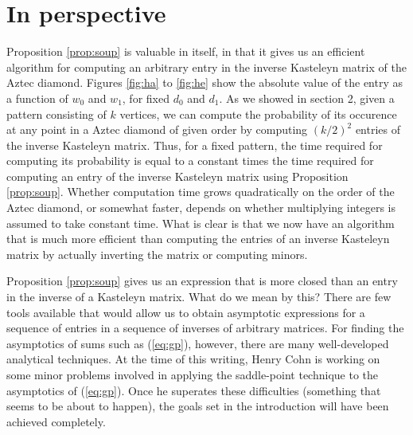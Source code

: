 \documentclass[10pt,reqno]{amsart}
\theoremstyle{plain}
\theoremstyle{definition}
\theoremstyle{remark}
\begin{document}
\section{In perspective}

Proposition \ref{prop:soup} is valuable in itself, in that it gives us an
efficient algorithm for computing an arbitrary entry in the inverse
Kasteleyn matrix of the Aztec diamond. Figures \ref{fig:ha} to 
\ref{fig:he} show the absolute value of the entry as a function of
$w_0$ and $w_1$, for fixed $d_0$ and $d_1$. As we showed in section 2,
given a pattern consisting of $k$ vertices,
we can compute the probability of its occurence at any point in
a Aztec diamond of given order
by computing $(k/2)^2$ entries of the inverse Kasteleyn
matrix. Thus, for a fixed pattern, the time
required for computing its probability is equal to a constant times
the time required for computing an entry of the inverse Kasteleyn matrix
using Proposition \ref{prop:soup}. Whether computation time grows quadratically
on the order of the Aztec diamond,
or somewhat faster, depends on whether multiplying integers is assumed
to take constant time. What is clear is that we now have an algorithm
that is much more efficient than computing the entries of an inverse
Kasteleyn matrix by actually inverting the matrix or computing minors.

Proposition
\ref{prop:soup} gives us an expression that is more closed than an entry
in the inverse of a Kasteleyn matrix. What do we mean by this?
There are few tools available that would allow us to obtain asymptotic
expressions for a sequence of entries in a sequence of inverses of 
arbitrary matrices. For finding the asymptotics of 
sums such as (\ref{eq:gp}), however, there are
many well-developed analytical techniques.
At the time of this writing, Henry Cohn is working on some minor 
problems involved in applying the saddle-point technique to the asymptotics
of (\ref{eq:gp}). Once he superates these difficulties 
(something that seems to be about to happen), the goals set in the introduction
will have been achieved completely.
\end{document}
